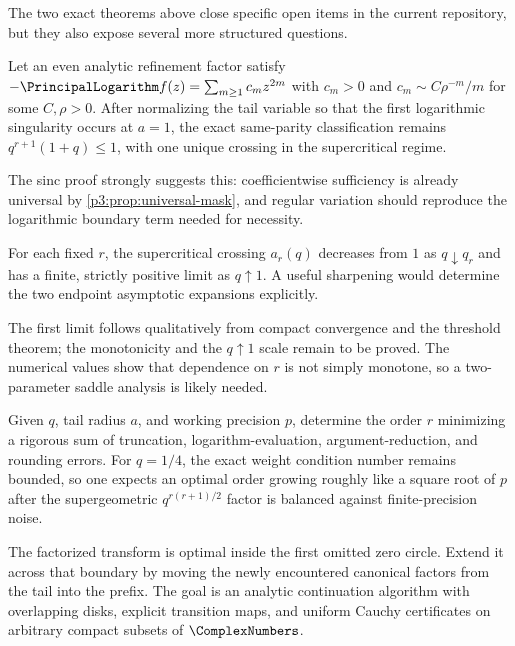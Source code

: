 \documentclass[11pt]{article}
\numberwithin{equation}{section}
\theoremstyle{definition}
\theoremstyle{remark}
\begin{document}
The two exact theorems above close specific open items in the current repository, but they
also expose several more structured questions.

\begin{conjecture}\label{p3:conj:regular-variation}
Let an even analytic refinement factor satisfy
$-\PrincipalLogarithm f(z)=\sum_{m\ge1}c_mz^{2m}$ with $c_m>0$ and
$c_m\sim C\rho^{-m}/m$ for some $C,\rho>0$.  After normalizing the tail variable so that the
first logarithmic singularity occurs at $a=1$, the exact same-parity classification remains
$q^{r+1}(1+q)\le1$, with one unique crossing in the supercritical regime.
\end{conjecture}

The sinc proof strongly suggests this: coefficientwise sufficiency is already universal by
\cref{p3:prop:universal-mask}, and regular variation should reproduce the logarithmic boundary
term needed for necessity.

\begin{conjecture}\label{p3:conj:crossing-curve}
For each fixed $r$, the supercritical crossing $a_r(q)$ decreases from $1$ as
$q\downarrow q_r$ and has a finite, strictly positive limit as $q\uparrow1$.  A useful
sharpening would determine the two endpoint asymptotic expansions explicitly.
\end{conjecture}

The first limit follows qualitatively from compact convergence and the threshold theorem;
the monotonicity and the $q\uparrow1$ scale remain to be proved.  The numerical values show
that dependence on $r$ is not simply monotone, so a two-parameter saddle analysis is likely
needed.

\begin{problem}\label{p3:prob:finite-precision}
Given $q$, tail radius $a$, and working precision $p$, determine the order $r$ minimizing a
rigorous sum of truncation, logarithm-evaluation, argument-reduction, and rounding errors.
For $q=1/4$, the exact weight condition number remains bounded, so one expects an optimal
order growing roughly like a square root of $p$ after the supergeometric
$q^{r(r+1)/2}$ factor is balanced against finite-precision noise.
\end{problem}

\begin{problem}\label{p3:prob:complex-boundary}
The factorized transform is optimal inside the first omitted zero circle.  Extend it across
that boundary by moving the newly encountered canonical factors from the tail into the
prefix.  The goal is an analytic continuation algorithm with overlapping disks, explicit
transition maps, and uniform Cauchy certificates on arbitrary compact subsets of $\ComplexNumbers$.
\end{problem}
\end{document}
